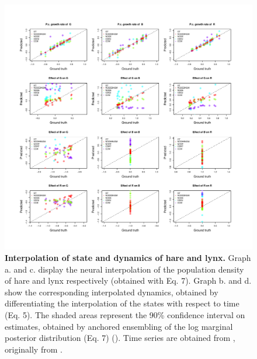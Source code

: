 \documentclass[11pt, oneside]{article}
\begin{document}
\begin{figure}[H]
\includegraphics[width=1\linewidth,page=15]{figures/figures_supplementary.pdf}
\caption{
    \textbf{Interpolation of state and dynamics of hare and lynx.}
    Graph a. and c. display the neural interpolation of the population density of hare and lynx respectively (obtained with Eq. 7). 
    Graph b. and d. show the corresponding interpolated dynamics, obtained by differentiating the interpolation of the states with respect to time (Eq. 5).
    The shaded areas represent the 90\% confidence interval on estimates, obtained by anchored ensembling of the log marginal posterior distribution (Eq. 7) (\cite{Pearce2018}).
    Time series are obtained from \cite{Bonnaffe2021a}, originally from \cite{Odum1972}.
}
\end{figure}
\newpage
\end{document}
